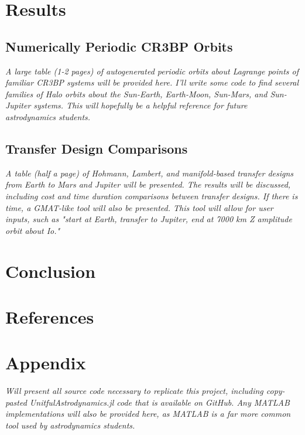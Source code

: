 \documentclass[conf]{new-aiaa}
\renewcommand\refname{}
\begin{document}
\begin{multicols*}{2}
\section{Results}

\subsection{Numerically Periodic CR3BP Orbits}

\textit{
    A large table (1-2 pages) of autogenerated periodic
    orbits about Lagrange points of familiar 
    CR3BP systems will be provided here. I'll write 
    some code to find several families of Halo orbits 
    about the Sun-Earth, Earth-Moon, Sun-Mars, and 
    Sun-Jupiter systems. This will hopefully be a 
    helpful reference for future astrodynamics students.
}

\subsection{Transfer Design Comparisons}

\textit{
    A table (half a page) of Hohmann, Lambert, 
    and manifold-based transfer designs from 
    Earth to Mars and Jupiter will be presented. 
    The results will be discussed, including
    cost and time duration comparisons between
    transfer designs. If there is time, a GMAT-like 
    tool will also be presented. This tool 
    will allow for user inputs, such as 
    "start at Earth, transfer to Jupiter, 
    end at 7000 km Z amplitude orbit 
    about Io."
}

\section{Conclusion}

\section{References}
\nocite{*}
\renewcommand\refname{\vskip -0.9cm}


\section{Appendix}
\textit{
    Will present all source code necessary to replicate 
    this project, including copy-pasted UnitfulAstrodynamics.jl
    code that is available on GitHub. Any MATLAB implementations 
    will also be provided here, as MATLAB is a far more common 
    tool used by astrodynamics students. 
}

\end{multicols*}
\end{document}
